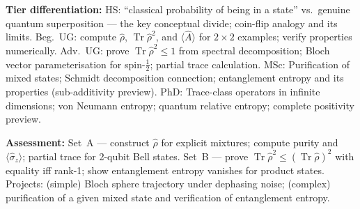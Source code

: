 \documentclass[11pt,a4paper]{article}
\begin{document}
\begin{tcolorbox}[modulebox, title={Module~I.3 --- Lecture L01 (cont.): Pure/Mixed States and the Density Matrix (\S2.3--2.5)}]
\medskip\textbf{Tier differentiation:}
HS: ``classical probability of being in a state'' vs.\ genuine quantum superposition ---
the key conceptual divide; coin-flip analogy and its limits.
Beg.\ UG: compute $\hat{\rho}$, $\operatorname{Tr}\hat{\rho}^2$, and $\langle\hat{A}\rangle$
for $2\times 2$ examples; verify properties numerically.
Adv.\ UG: prove $\operatorname{Tr}\hat{\rho}^2\leq 1$ from spectral decomposition;
Bloch vector parameterisation for spin-$\tfrac{1}{2}$; partial trace calculation.
MSc: Purification of mixed states; Schmidt decomposition connection;
entanglement entropy and its properties (sub-additivity preview).
PhD: Trace-class operators in infinite dimensions; von Neumann entropy;
quantum relative entropy; complete positivity preview.

\medskip\textbf{Assessment:}
Set~A --- construct $\hat{\rho}$ for explicit mixtures; compute purity and $\langle\hat{\sigma}_z\rangle$;
partial trace for 2-qubit Bell states.
Set~B --- prove $\operatorname{Tr}\hat{\rho}^2\leq(\operatorname{Tr}\hat{\rho})^2$ with equality
iff rank-1; show entanglement entropy vanishes for product states.
Projects: (simple) Bloch sphere trajectory under dephasing noise; (complex) purification of a given
mixed state and verification of entanglement entropy.
\end{tcolorbox}
\end{document}
